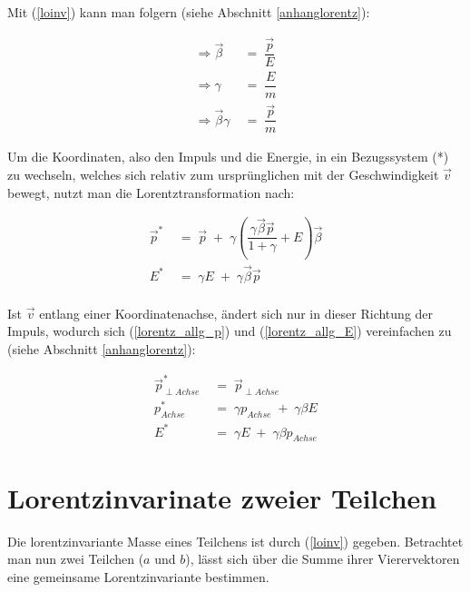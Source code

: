\documentclass[
a4paper,                                %
twoside,                                %
BCOR1.4cm,                      %
ngerman,                                %
10pt,                           %
headings=normal,                %
headsepline,                    %
clearplainpage, %
final,                                  %
div=14,
parskip=full
]{scrbook}
\begin{document}
Mit (\ref{loinv}) kann man folgern (siehe Abschnitt \ref{anhanglorentz}):

\begin{align}
\Rightarrow
	\vec{\beta}
\;&=\;
	\dfrac{\vec{p}}{E}
\label{betapE}
\\
\Rightarrow
	\gamma
\;&=\;
	\dfrac{E}{m}
\\
\Rightarrow
	\vec{\beta} \gamma
\;&=\;
	\dfrac{\vec{p}}{m}
\label{betagamma}
\end{align}

Um die Koordinaten, also den Impuls und die Energie, in ein Bezugssystem (*) zu wechseln, welches sich relativ zum urspr\"unglichen mit der Geschwindigkeit $ \vec{v} $ bewegt, nutzt man die Lorentztransformation nach:

\begin{align}
	\vec{p}^{*}
\;&=\;
	\vec{p}\;+\;\gamma
	\left(
		\dfrac{\gamma \vec{\beta} \vec{p}}{1 + \gamma} + E
	\right)
	\vec{\beta}
\label{lorentz_allg_p}
\\
	E^{*}
\;&=\;
	\gamma E\;+\;
	\gamma \vec{\beta} \vec{p}
\label{lorentz_allg_E}
\\
\nonumber
\end{align}

Ist $ \vec{v} $ entlang einer Koordinatenachse, \"andert sich nur in dieser Richtung der Impuls, wodurch sich (\ref{lorentz_allg_p}) und (\ref{lorentz_allg_E}) vereinfachen zu (siehe Abschnitt \ref{anhanglorentz}):

\begin{align}
	\vec{p}_{\perp Achse}^{*}
\;&=\;
	\vec{p}_{\perp Achse}
\\
	p_{Achse}^{*}
\;&=\;
	\gamma p_{Achse}\;+\;
	\gamma \beta E
\label{lorentz_spez_p}
\\
	E^{*}
\;&=\;
	\gamma E\;+\;
	\gamma \beta p_{Achse}
\label{lorentz_spez_E}
\end{align}

\section{Lorentzinvarinate zweier Teilchen}

Die lorentzinvariante Masse eines Teilchens ist durch (\ref{loinv}) gegeben. Betrachtet man nun zwei Teilchen ($ a $ und $ b $), l\"asst sich \"uber die Summe ihrer Vierervektoren eine gemeinsame Lorentzinvariante bestimmen.
\end{document}
